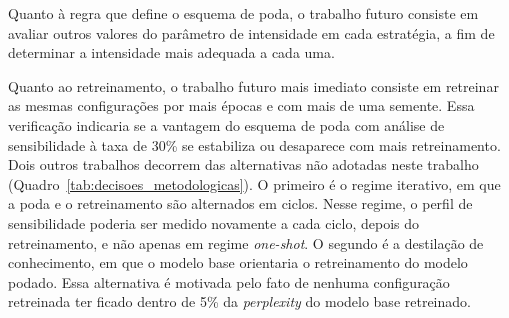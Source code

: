 Quanto à regra que define o esquema de poda, o trabalho futuro consiste em avaliar outros
valores do parâmetro de intensidade em cada estratégia, a fim de determinar a intensidade mais
adequada a cada uma.

Quanto ao retreinamento, o trabalho futuro mais imediato consiste em retreinar as mesmas
configurações por mais épocas e com mais de uma semente. Essa verificação indicaria se a
vantagem do esquema de poda com análise de sensibilidade à taxa de 30\% se estabiliza ou
desaparece com mais retreinamento. Dois outros trabalhos decorrem das alternativas não adotadas
neste trabalho (Quadro~\ref{tab:decisoes_metodologicas}). O primeiro é o regime iterativo, em
que a poda e o retreinamento são alternados em ciclos. Nesse regime, o perfil de sensibilidade
poderia ser medido novamente a cada ciclo, depois do retreinamento, e não apenas em regime
\textit{one-shot}. O segundo é a destilação de conhecimento,
em que o modelo base orientaria o retreinamento do
modelo podado. Essa alternativa é motivada pelo fato de nenhuma configuração retreinada ter
ficado dentro de 5\% da \textit{perplexity} do modelo base retreinado.
